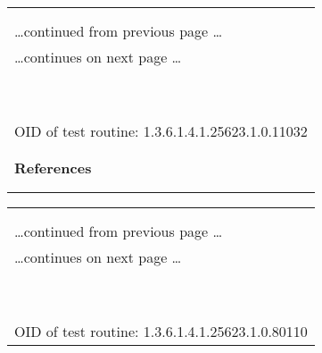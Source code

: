\documentclass{article}
\begin{document}
\begin{longtable}{|p{}|}
\hline
\rowcolor{openvas_log}{\color{white}{Log (CVSS: 0.0) }}\\
\rowcolor{openvas_log}{\color{white}{NVT: Directory Scanner}}\\
\hline
\endfirsthead
\hfill\ldots continued from previous page \ldots \\
\hline
\endhead
\hline
\ldots continues on next page \ldots \\
\endfoot
\hline
\endlastfoot
\\
\rowcolor{white}{\verb=The following directories were discovered:=}\\
\rowcolor{white}{\verb=/cgi-bin, /icons=}\\
\rowcolor{white}{\verb=While this is not, in and of itself, a bug, you should manually inspect =}\\
\rowcolor{white}{\verb=these directories to ensure that they are in compliance with company=}\\
\rowcolor{white}{\verb=security standards=}\\
\rowcolor{white}{\verb==}\\
\rowcolor{white}{\verb==}\\
\\
OID of test routine: 1.3.6.1.4.1.25623.1.0.11032\\
\\

      \hline
      \\
\textbf{References}\\
\rowcolor{white}{\verb=Other:=}\\
\rowcolor{white}{\verb=  OWASP:OWASP-CM-006=}\\
\end{longtable}

\begin{longtable}{|p{}|}
\hline
\rowcolor{openvas_log}{\color{white}{Log (CVSS: 0.0) }}\\
\rowcolor{openvas_log}{\color{white}{NVT: wapiti (NASL wrapper)}}\\
\hline
\endfirsthead
\hfill\ldots continued from previous page \ldots \\
\hline
\endhead
\hline
\ldots continues on next page \ldots \\
\endfoot
\hline
\endlastfoot
\\
\rowcolor{white}{\verb=wapiti could not be found in your system path.=}\\
\rowcolor{white}{\verb=OpenVAS was unable to execute wapiti and to perform the scan you=}\\
\rowcolor{white}{\verb=requested.=}\\
\rowcolor{white}{\verb=Please make sure that wapiti is installed and that wapiti is=}\\
\rowcolor{white}{\verb=available in the PATH variable defined for your environment.=}\\
\rowcolor{white}{\verb==}\\
\rowcolor{white}{\verb==}\\
\\
OID of test routine: 1.3.6.1.4.1.25623.1.0.80110\\
\end{longtable}
\end{document}
